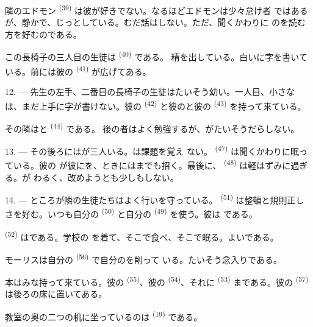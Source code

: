 隣のエドモン \textsuperscript{(39)} は彼が好きでない。なるほどエドモンは少々怠け者
ではあるが、静かで、じっとしている。むだ話はしない。ただ、聞くかわりに
のを読む方を好むのである。

この長椅子の三人目の生徒は \textsuperscript{(40)} である。
精を出している。白いに字を書いている。前には彼の
\textsuperscript{(41)} が広げてある。

12. --- 先生の左手、二番目の長椅子の生徒はたいそう幼い。一人目、小さな
は、まだ上手に字が書けない。彼の
\textsuperscript{(42)} と彼のと彼の \textsuperscript{(43)}
を持って来ている。

その隣はと \textsuperscript{(44)} である。
後の者はよく勉強するが、がたいそうだらしない。

13. --- その後ろにはが三人いる。は課題を覚え
ない。 \textsuperscript{(47)} は聞くかわりに眠っている。彼の
が彼にを、ときにはまでも招く。最後に、
 \textsuperscript{(48)} は軽はずみに過ぎる。が
わるく、改めようとも少しもしない。

14. --- ところが隣の生徒たちはよく行いを守っている。
\textsuperscript{(51)} は整頓と規則正しさを好む。いつも自分の
\textsuperscript{(50)} と自分の \textsuperscript{(49)} を使う。彼は
である。

 \textsuperscript{(52)} はである。学校の
を着て、そこで食べ、そこで眠る。よいである。

モーリスは自分の \textsuperscript{(56)} で自分のを削って
いる。たいそう念入りである。

本はみな持って来ている。彼の \textsuperscript{(55)}、彼の
 \textsuperscript{(54)}、それに \textsuperscript{(53)}
まである。彼の \textsuperscript{(57)} は後ろの床に置いてある。

教室の奥の二つの机に坐っているのは \textsuperscript{(19)} である。

\VUsaut{4.6mm}
\VUsaut{3.4mm}

